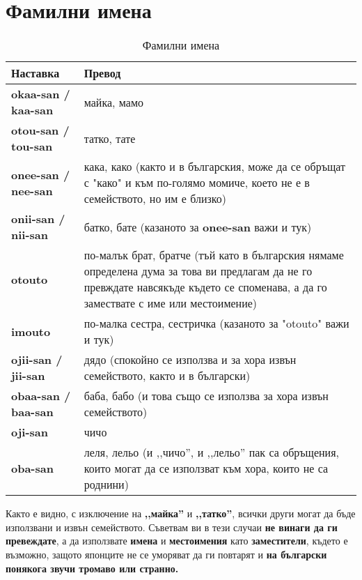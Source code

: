 \section{Фамилни имена}

\begin{table}[htbp]
    \centering
        \begin{tabular}{|p{}|p{}|}
            \hline
            \textbf{Наставка} & \textbf{Превод} \\ \hline
            \textbf{okaa-san / kaa-san}&майка, мамо\\ 
        \textbf{otou-san / tou-san}&татко, тате\\ 
        \textbf{onee-san / nee-san}&кака, како (както и в българския, може да се обръщат с "како" и към по-голямо момиче, което не е в семейството, но им е близко)\\ 
        \textbf{onii-san / nii-san}&батко, бате (казаното за \textbf{onee-san} важи и тук)\\ 
        \textbf{otouto}&по-малък брат, братче (тъй като в българския нямаме определена дума за това ви предлагам да не го превждате навсякъде където се споменава, а да го замествате с име или местоимение)\\ 
        \textbf{imouto}&по-малка сестра, сестричка (казаното за "otouto" важи и тук)\\ 
        \textbf{ojii-san / jii-san}&дядо (спокойно се използва и за хора извън семейството, както и в български)\\ 
        \textbf{obaa-san / baa-san}&баба, бабо (и това също се използва за хора извън семейството)\\ 
        \textbf{oji-san}&чичо\\ 
        \textbf{oba-san}&леля, лельо (и ,,чичо'', и ,,лельо'' пак са обръщения, които могат да се използват към хора, които не са роднини)\\ 
        
        \hline
        \end{tabular}
    \caption{Фамилни имена}
    \label{tab:familynames}
\end{table}

Както е видно, с изключение на \textbf{,,майка''} и \textbf{,,татко''}, всички други могат да бъде използвани и извън семейството.
Съветвам ви в тези случаи \textbf{не винаги да ги превеждате}, а да използвате \textbf{имена} и \textbf{местоимения} като \textbf{заместители}, където е възможно, защото японците не се уморяват да ги повтарят и \textbf{на български понякога звучи тромаво или странно.}


